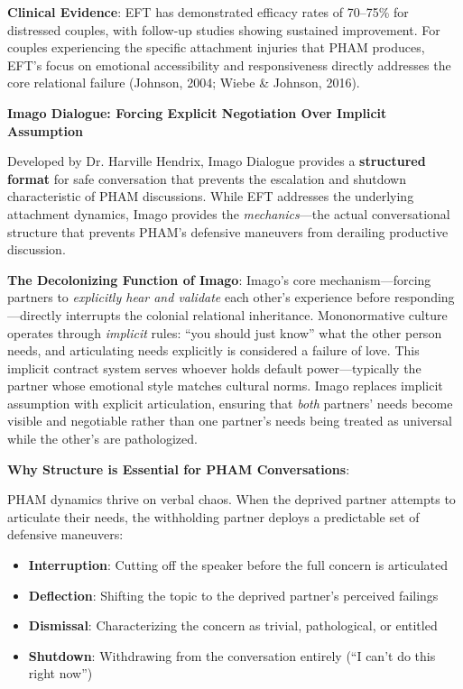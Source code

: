 \documentclass[12pt,openany]{book}
\numberwithin{equation}{chapter}
\begin{document}
\textbf{Clinical Evidence}: EFT has demonstrated efficacy rates of 70--75\% for distressed couples, with follow-up studies showing sustained improvement. For couples experiencing the specific attachment injuries that PHAM produces, EFT's focus on emotional accessibility and responsiveness directly addresses the core relational failure (Johnson, 2004; Wiebe \& Johnson, 2016).

\textbf{Imago Dialogue: Forcing Explicit Negotiation Over Implicit Assumption}

Developed by Dr. Harville Hendrix, Imago Dialogue provides a \textbf{structured format} for safe conversation that prevents the escalation and shutdown characteristic of PHAM discussions. While EFT addresses the underlying attachment dynamics, Imago provides the \textit{mechanics}---the actual conversational structure that prevents PHAM's defensive maneuvers from derailing productive discussion.

\textbf{The Decolonizing Function of Imago}: Imago's core mechanism---forcing partners to \textit{explicitly hear and validate} each other's experience before responding---directly interrupts the colonial relational inheritance. Mononormative culture operates through \textit{implicit} rules: ``you should just know'' what the other person needs, and articulating needs explicitly is considered a failure of love. This implicit contract system serves whoever holds default power---typically the partner whose emotional style matches cultural norms. Imago replaces implicit assumption with explicit articulation, ensuring that \textit{both} partners' needs become visible and negotiable rather than one partner's needs being treated as universal while the other's are pathologized.

\textbf{Why Structure is Essential for PHAM Conversations}:

PHAM dynamics thrive on verbal chaos. When the deprived partner attempts to articulate their needs, the withholding partner deploys a predictable set of defensive maneuvers:
\begin{itemize}
    \item \textbf{Interruption}: Cutting off the speaker before the full concern is articulated
    \item \textbf{Deflection}: Shifting the topic to the deprived partner's perceived failings
    \item \textbf{Dismissal}: Characterizing the concern as trivial, pathological, or entitled
    \item \textbf{Shutdown}: Withdrawing from the conversation entirely (``I can't do this right now'')
\end{itemize}
\end{document}
